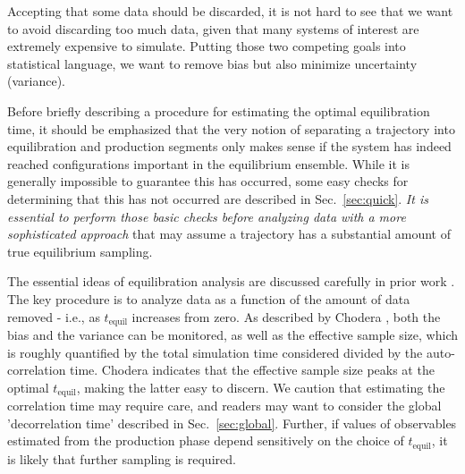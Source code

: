 Accepting that some data should be discarded, it is not hard to see that we want to avoid discarding too much data, given that many systems of interest are extremely expensive to simulate.
Putting those two competing goals into statistical language, we want to remove bias but also minimize uncertainty (variance).

Before briefly describing a procedure for estimating the optimal equilibration time, it should be emphasized that the very notion of separating a trajectory into equilibration and production segments
only makes sense if the system has indeed reached configurations important in the equilibrium ensemble.
While it is generally impossible to guarantee this has occurred, some easy checks for determining that this has not occurred are described in Sec.\ \ref{sec:quick}.
\emph{It is essential to perform those basic checks before analyzing data with a more sophisticated approach} that may assume a trajectory has a substantial amount of true equilibrium sampling.

The essential ideas of equilibration analysis are discussed carefully in prior work \cite{Yang2004,Chodera-2016}.
The key procedure is to analyze data as a function of the amount of data removed - i.e., as $t_{\mathrm{equil}}$ increases from zero.
As described by Chodera \cite{Chodera-2016}, both the bias and the variance can be monitored, as well as the effective sample size, which is roughly quantified by the total simulation time considered divided by the auto-correlation time.
Chodera indicates that the effective sample size peaks at the optimal $t_{\mathrm{equil}}$, making the latter easy to discern.
We caution that estimating the correlation time may require care, and readers may want to consider the global 'decorrelation time' \cite{Lyman2007a} described in Sec.\ \ref{sec:global}.
Further, if values of observables estimated from the production phase depend sensitively on the choice of $t_{\mathrm{equil}}$, it is likely that further sampling is required.
